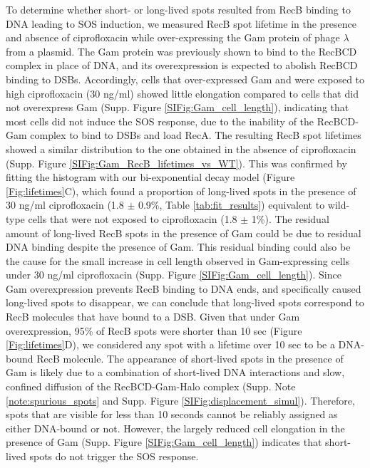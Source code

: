 To determine whether short- or long-lived spots resulted from RecB binding to DNA leading to SOS induction, we measured RecB spot lifetime in the presence and absence of ciprofloxacin while over-expressing the Gam protein of phage $\lambda$ from a plasmid. The Gam protein was previously shown to bind to the RecBCD complex in place of DNA\cite{Wilkinson2016}, and its overexpression is expected to abolish RecBCD binding to DSBs. Accordingly, cells that over-expressed Gam and were exposed to high ciprofloxacin (30 ng/ml) showed little elongation compared to cells that did not overexpress Gam (Supp. Figure \ref{SIFig:Gam_cell_length}), indicating that most cells did not induce the SOS response, due to the inability of the RecBCD-Gam complex to bind to DSBs and load RecA. The resulting RecB spot lifetimes showed a similar distribution to the one obtained in the absence of ciprofloxacin (Supp. Figure \ref{SIFig:Gam_RecB_lifetimes_vs_WT}). This was confirmed by fitting the histogram with our bi-exponential decay model (Figure \ref{Fig:lifetimes}C), which found a proportion of long-lived spots in the presence of 30 ng/ml ciprofloxacin (1.8 $\pm$ 0.9\%, Table \ref{tab:fit_results}) equivalent to wild-type cells that were not exposed to ciprofloxacin (1.8 $\pm$ 1\%). The residual amount of long-lived RecB spots in the presence of Gam could be due to residual DNA binding despite the presence of Gam. This residual binding could also be the cause for the small increase in cell length observed in Gam-expressing cells under 30 ng/ml ciprofloxacin (Supp. Figure \ref{SIFig:Gam_cell_length}). Since Gam overexpression prevents RecB binding to DNA ends, and specifically caused long-lived spots to disappear, we can conclude that long-lived spots correspond to RecB molecules that have bound to a DSB. Given that under Gam overexpression, 95\% of RecB spots were shorter than 10 sec (Figure \ref{Fig:lifetimes}D), we considered any spot with a lifetime over 10 sec to be a DNA-bound RecB molecule. The appearance of short-lived spots in the presence of Gam is likely due to a combination of short-lived DNA interactions and slow, confined diffusion of the RecBCD-Gam-Halo complex (Supp. Note \ref{note:spurious_spots} and Supp. Figure \ref{SIFig:displacement_simul}). Therefore, spots that are visible for less than 10 seconds cannot be reliably assigned as either DNA-bound or not. However, the largely reduced cell elongation in the presence of Gam (Supp. Figure \ref{SIFig:Gam_cell_length}) indicates that short-lived spots do not trigger the SOS response.


